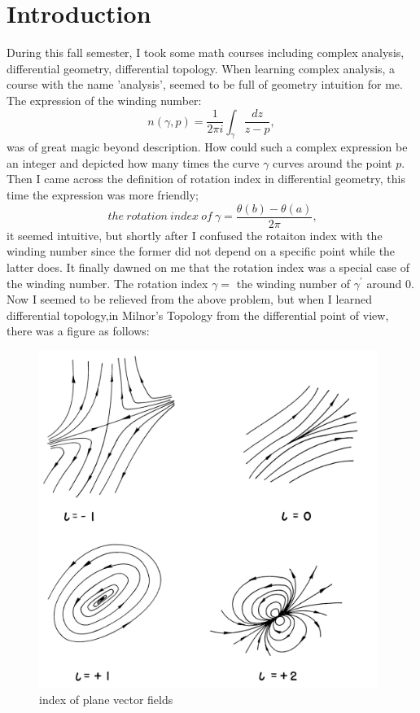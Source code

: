 \documentclass[11pt]{article}
\numberwithin{equation}{section} \numberwithin{theorem}{section}
\numberwithin{lemma}{section} \numberwithin{remark}{section}
\numberwithin{table}{section} \numberwithin{corollary}{section}
\numberwithin{example}{section} \numberwithin{conjecture}{section}
\numberwithin{assumption}{section}
\numberwithin{definition}{section}
\numberwithin{proposition}{section}
\begin{document}
\section{Introduction}
During this fall semester, I took some math courses including complex analysis, differential geometry, differential topology. When learning complex analysis, a course with the name 'analysis', seemed to be full of geometry intuition for me. The expression of the winding number:
\begin{equation}
    n(\gamma,p)=\frac{1}{2\pi i} \int_{\gamma}\frac{dz}{z-p},
\end{equation}
was of great magic beyond description. How could such a complex expression be an integer and depicted how many times the curve $\gamma$ curves around the point $p$. Then I came across the definition of rotation index in differential geometry, this time the expression was more friendly;
\begin{equation}
    \ the\  rotation \ index\  of\  \gamma = \frac{\theta(b)-\theta(a)}{2\pi},
\end{equation}
it seemed intuitive, but shortly after I confused the rotaiton index with the winding number since the former did not depend on a specific point while the latter does. It finally dawned on me that the rotation index was a special case of the winding number. The rotation index $\gamma =$ the winding number of $\gamma^{'}$ around 0.
Now I seemed to be relieved from the above problem, but when I learned differential topology,in Milnor's Topology from the differential point of view, there was a figure as follows:
\begin{figure}[H]
\includegraphics[width=11cm]{image/indexofvectorfields.png}
\centering
\caption{index of plane vector fields}
\end{figure}
\end{document}
